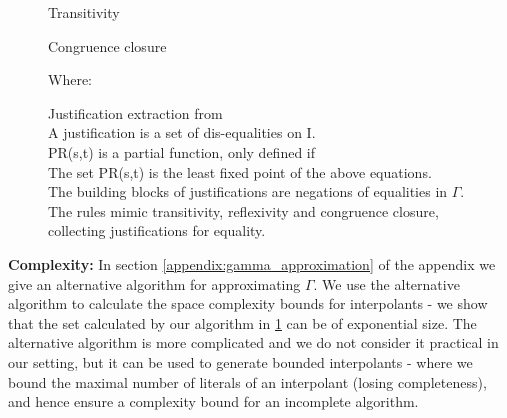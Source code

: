 \begin{figure}

\bigskip


\bigskip


\bigskip
Transitivity\\

\bigskip

Congruence closure\\


\bigskip

\noindent
Where:\\

\caption{Justification extraction from \\
A justification is a set of dis-equalities on I.\\
PR(s,t) is a partial function, only defined if \\
The set PR(s,t) is the least fixed point of the above equations.\\
The building blocks of justifications are negations of equalities in $\Gamma$.\\
The rules mimic transitivity, reflexivity and congruence closure, collecting justifications for equality.
}
\label{PR_def}
\end{figure}


\textbf{Complexity:} In section \ref{appendix:gamma_approximation} of the appendix we give an alternative algorithm for approximating $\Gamma$.
We use the alternative algorithm to calculate the space complexity bounds for interpolants - we show that the set calculated by our algorithm in \ref{PR_def} can be of exponential size.
The alternative algorithm is more complicated and we do not consider it practical in our setting, but it can be used to generate bounded interpolants - where we bound the maximal number of literals of an interpolant (losing completeness), and hence ensure a complexity bound for an incomplete algorithm.

